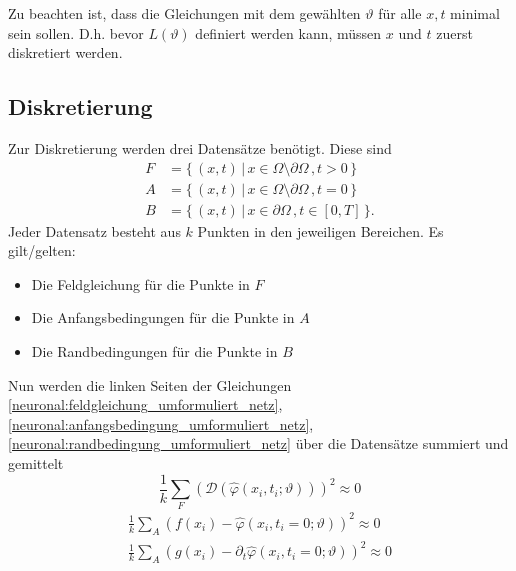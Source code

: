 Zu beachten ist, dass die Gleichungen mit dem gewählten $\vartheta$ für alle $x, t$ minimal sein sollen.
D.h. bevor $L(\vartheta)$ definiert werden kann, müssen $x$ und $t$ zuerst diskretiert werden.

\subsection{Diskretierung}\label{neuronal:subsection:diskretierung}
Zur Diskretierung werden drei Datensätze benötigt.
Diese sind
\begin{equation}
    \begin{aligned}
        F &= \{\, (x, t) \,|\, x \in \Omega \setminus \partial \Omega\,, t > 0 \,\}\\
        A &= \{\, (x, t) \,|\, x \in \Omega \setminus \partial \Omega\,, t = 0 \,\}\\
        B &= \{\, (x, t) \,|\, x \in \partial \Omega\,, t \in [0, T] \,\}.
    \end{aligned}
\end{equation}
Jeder Datensatz besteht aus $k$ Punkten in den jeweiligen Bereichen.
Es gilt/gelten:
\begin{itemize}
    \item Die Feldgleichung für die Punkte in $F$
    \item Die Anfangsbedingungen für die Punkte in $A$
    \item Die Randbedingungen für die Punkte in $B$
\end{itemize}
Nun werden die linken Seiten der Gleichungen \eqref{neuronal:feldgleichung_umformuliert_netz}, \eqref{neuronal:anfangsbedingung_umformuliert_netz}, \eqref{neuronal:randbedingung_umformuliert_netz} über die Datensätze summiert und gemittelt
\begin{equation}
    \frac{1}{k} \sum_{F}^{} \left(\mathcal{D}(\hat{\varphi}(x_i, t_i; \vartheta))\right)^2 \approx 0
    \label{neuronal:feldgleichung_umformuliert_netz_disk}
\end{equation}
\begin{equation}
    \begin{aligned}
        \frac{1}{k} \sum_{A}^{} \left(f(x_i) - \hat{\varphi}(x_i, t_i = 0; \vartheta)\right)^2 \approx 0\\
        \frac{1}{k} \sum_{A}^{} \left(g(x_i) - \partial_t \hat{\varphi}(x_i, t_i = 0; \vartheta)\right)^2 \approx 0
    \end{aligned}
    \label{neuronal:anfangsbedingung_umformuliert_netz_disk}
\end{equation}
